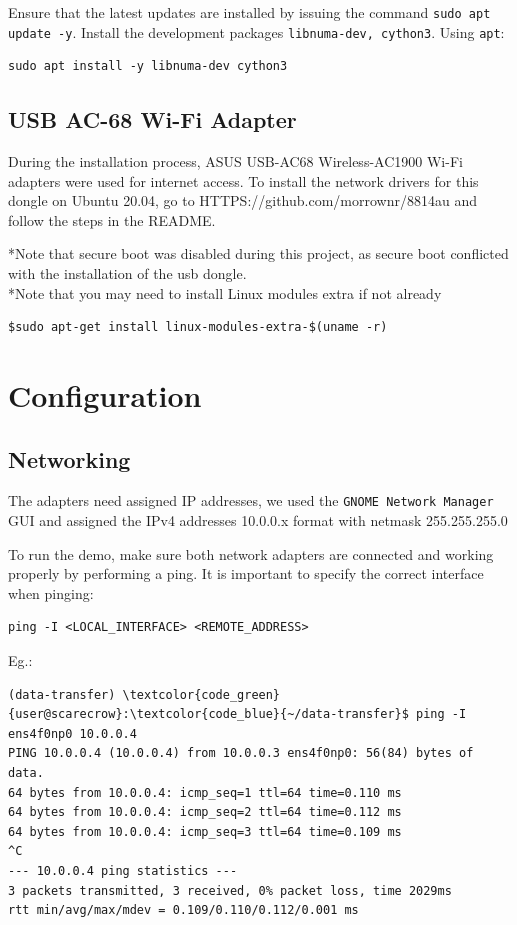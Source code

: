 \documentclass[a4paper,onecolumn]{article}
\begin{document}
Ensure that the latest updates are installed by issuing the command \verb|sudo apt update -y|. Install the development packages \verb|libnuma-dev, cython3|. Using \verb|apt|:

\begin{verbatim}
sudo apt install -y libnuma-dev cython3
\end{verbatim}

\subsection{USB AC-68 Wi-Fi Adapter}
During the installation process, ASUS USB-AC68 Wireless-AC1900 Wi-Fi adapters were used for internet access. To install the network drivers for this dongle on Ubuntu 20.04, go to HTTPS://github.com/morrownr/8814au and follow the steps in the README.

*Note that secure boot was disabled during this project, as secure boot conflicted with the installation of the usb dongle. \\
*Note that you may need to install Linux modules extra if not already \\
\begin{verbatim}
$sudo apt-get install linux-modules-extra-$(uname -r)
\end{verbatim}

\section{Configuration}

\subsection{Networking}
The adapters need assigned IP addresses, we used the \verb|GNOME Network Manager| GUI and assigned the IPv4 addresses 10.0.0.x format with netmask 255.255.255.0

To run the demo, make sure both network adapters are connected and working properly by performing a ping. It is important to specify the correct interface when pinging:

\begin{verbatim}
ping -I <LOCAL_INTERFACE> <REMOTE_ADDRESS>
\end{verbatim}

Eg.:
\begin{Verbatim}[commandchars=\\\{\}]
(data-transfer) \textcolor{code_green}{user@scarecrow}:\textcolor{code_blue}{~/data-transfer}$ ping -I ens4f0np0 10.0.0.4
PING 10.0.0.4 (10.0.0.4) from 10.0.0.3 ens4f0np0: 56(84) bytes of data.
64 bytes from 10.0.0.4: icmp_seq=1 ttl=64 time=0.110 ms
64 bytes from 10.0.0.4: icmp_seq=2 ttl=64 time=0.112 ms
64 bytes from 10.0.0.4: icmp_seq=3 ttl=64 time=0.109 ms
^C
--- 10.0.0.4 ping statistics ---
3 packets transmitted, 3 received, 0% packet loss, time 2029ms
rtt min/avg/max/mdev = 0.109/0.110/0.112/0.001 ms
\end{Verbatim}
\end{document}
